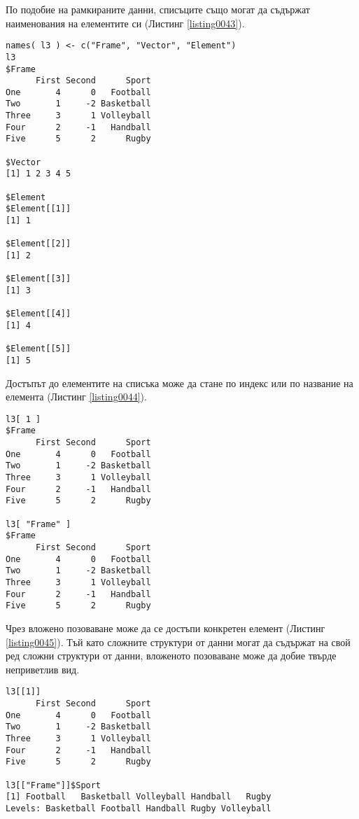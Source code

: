 По подобие на рамкираните данни, списъците също могат да съдържат наименования на елементите си (Листинг \ref{listing0043}).

\begin{lstlisting}[caption=Названия на елементите в списъка, label=listing0043]
names( l3 ) <- c("Frame", "Vector", "Element")
l3
$Frame
      First Second      Sport
One       4      0   Football
Two       1     -2 Basketball
Three     3      1 Volleyball
Four      2     -1   Handball
Five      5      2      Rugby

$Vector
[1] 1 2 3 4 5

$Element
$Element[[1]]
[1] 1

$Element[[2]]
[1] 2

$Element[[3]]
[1] 3

$Element[[4]]
[1] 4

$Element[[5]]
[1] 5
\end{lstlisting}

Достъпът до елементите на списъка може да стане по индекс или по название на елемента (Листинг \ref{listing0044}).

\begin{lstlisting}[caption=Достъп до елементите на списъка, label=listing0044]
l3[ 1 ]
$Frame
      First Second      Sport
One       4      0   Football
Two       1     -2 Basketball
Three     3      1 Volleyball
Four      2     -1   Handball
Five      5      2      Rugby

l3[ "Frame" ]
$Frame
      First Second      Sport
One       4      0   Football
Two       1     -2 Basketball
Three     3      1 Volleyball
Four      2     -1   Handball
Five      5      2      Rugby
\end{lstlisting}

Чрез вложено позоваване може да се достъпи конкретен елемент (Листинг \ref{listing0045}). Тъй като сложните структури от данни могат да съдържат на свой ред сложни структури от данни, вложеното позоваване може да добие твърде неприветлив вид.

\begin{lstlisting}[caption=Вложено позоваване, label=listing0045]
l3[[1]]
      First Second      Sport
One       4      0   Football
Two       1     -2 Basketball
Three     3      1 Volleyball
Four      2     -1   Handball
Five      5      2      Rugby

l3[["Frame"]]$Sport
[1] Football   Basketball Volleyball Handball   Rugby     
Levels: Basketball Football Handball Rugby Volleyball
\end{lstlisting}

